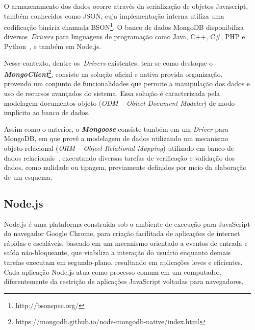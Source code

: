 \documentclass[12pt]{article}
\begin{document}
O armazenamento dos dados ocorre através da serialização de objetos Javascript, também conhecidos como JSON, cuja implementação interna utiliza uma codificação binária chamada BSON\footnote{http://bsonspec.org/}. 
O banco de dados MongoDB disponibiliza diversos~\emph{Drivers} para linguagens de programação como Java, C++, C\#, PHP e Python~\cite{lutu2015big}, e também em Node.js.

Nesse contexto, dentre os~\emph{Drivers} existentes, tem-se como destaque o \textbf{\textit{MongoClient}}\footnote{https://mongodb.github.io/node-mongodb-native/index.html}, consiste na solução oficial e nativa provida organização, provendo um conjunto de funcionalidades que permite a manipulação dos dados e uso de recursos avançados do sistema. 
Essa solução é caracterizada pela modelagem documentos-objeto (\emph{ODM -- Object-Document Modeler}) de modo implícito ao banco de dados.

Assim como o anterior, o \textbf{\textit{Mongoose}} consiste também em um \emph{Driver} para MongoDB, em que provê a modelagem de dados utilizando um mecanismo objeto-relacional (\emph{ORM -- Object Relational Mapping}) utilizado em banco de dados relacionais~\cite{mardan2014boosting}, executando diversas tarefas de verificação e validação dos dados, como nulidade ou tipagem, previamente definidos por meio da elaboração de um esquema.

\subsection{Node.js}
\label{subsection:nodejs}

Node.js é uma plataforma construída sob o ambiente de execução para JavaScript do navegador Google Chrome, para criação facilitada de aplicações de internet rápidas e escaláveis, baseado em um mecanismo orientado a eventos de entrada e saída não-bloqueante, que viabiliza a interação do usuário enquanto demais tarefas executam em segundo-plano, resultando em aplicações leves e eficientes.
Cada aplicação Node.js atua como processo comum em um computador, diferentemente da restrição de aplicações JavaScript voltadas para navegadores.

\end{document}
